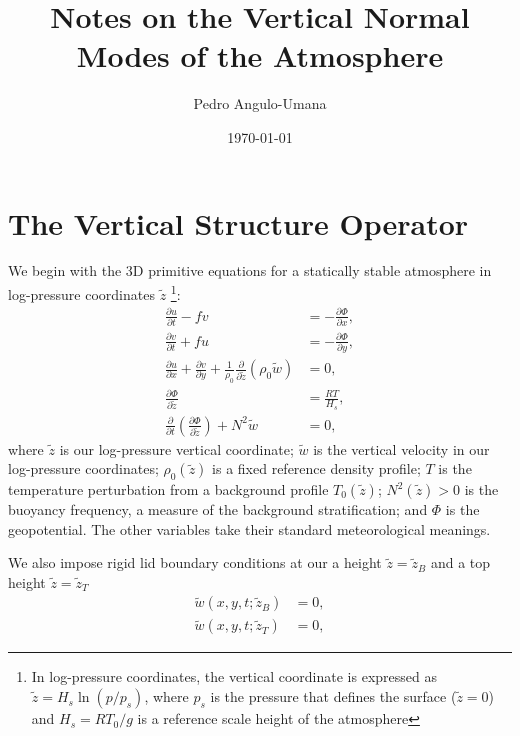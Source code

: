 \documentclass{article}
\title{%
  Notes on the Vertical Normal Modes of the Atmosphere
  }
\author{Pedro Angulo-Umana}
\date{\today}
\numberwithin{equation}{section}
\newcommand{\w}{\tilde{w}}
\newcommand{\z}{\tilde{z}}
\begin{document}
\maketitle
\tableofcontents


\section{The Vertical Structure Operator}
\label{sec:building_L}
We begin with the 3D primitive equations for a statically stable atmosphere in log-pressure coordinates $\z$
%
\footnote{In log-pressure coordinates, the vertical coordinate is expressed as $\z=H_s\ln(p/p_s)$, where $p_s$ is the pressure that defines the surface ($\z=0$) and $H_s=RT_0/g$ is a reference scale height of the atmosphere}:
%
\begin{subequations}
\label{eq:linear_system}
\begin{align}
\frac{\partial u}{\partial t} - f v
    &= -\frac{\partial \Phi}{\partial x},
    \label{eq:u_momentum} \\
\frac{\partial v}{\partial t} + f u
    &= -\frac{\partial \Phi}{\partial y},
    \label{eq:v_momentum} \\
\frac{\partial u}{\partial x}
+ \frac{\partial v}{\partial y}
+ \frac{1}{\rho_0}
  \frac{\partial}{\partial \z}
  \left( \rho_0 \w \right)
    &= 0,
    \label{eq:continuity} \\
\frac{\partial \Phi}{\partial \z}
    &= \frac{R T}{H_s},
    \label{eq:hydrostatic} \\
\frac{\partial}{\partial t}
\left(
    \frac{\partial \Phi}{\partial \z}
\right)
+ N^2 \w
    &= 0,
    \label{eq:thermodynamic}
\end{align}
\end{subequations}
%
where $\z$ is our log-pressure vertical coordinate; $\w$ is the vertical velocity in our log-pressure coordinates; $\rho_0(\z)$ is a fixed reference density profile; $T$ is the temperature perturbation from a background profile $T_0(\z)$; $N^2(\z)>0$ is the buoyancy frequency, a measure of the background stratification; and $\Phi$ is the geopotential. The other variables take their standard meteorological meanings.
%
\par We also impose rigid lid boundary conditions at our a height $\z=\z_B$ and a top height $\z=\z_T$
%
\begin{subequations}
\begin{align}
  \label{eq:rigid_lid}
\w(x,y,t;\z_B) &= 0, \\
\w(x,y,t;\z_T) &= 0,
\end{align}
\end{subequations}
\end{document}
